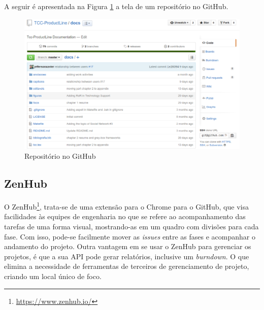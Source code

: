 A seguir é apresentada na Figura \ref{github} a tela de um repositório no GitHub.

\begin{figure}[!h]
	\centering
	\includegraphics[scale=0.35]{figuras/capitulo3/github.eps}
	\caption{Repositório no GitHub}
	\label{github}
\end{figure}

\subsection{ZenHub}

O ZenHub\footnote{\url{https://www.zenhub.io/}}, trata-se de uma extensão para o Chrome para o GitHub, que visa facilidades às equipes de engenharia no que se refere ao acompanhamento das tarefas de uma forma visual, mostrando-as em um quadro com divisões para cada fase. Com isso, pode-se facilmente mover as \textit{issues} entre as fases e acompanhar o andamento do projeto. Outra vantagem em se usar o ZenHub para gerenciar os projetos, é que a sua API pode gerar relatórios, inclusive um \textit{burndown}. O que elimina a necessidade de ferramentas de terceiros de gerenciamento de projeto, criando um local único de foco.

